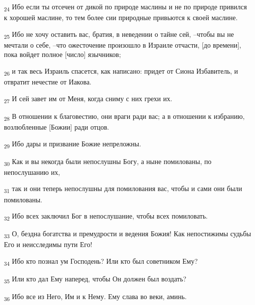 \begin{tcolorbox}
\textsubscript{24} Ибо если ты отсечен от дикой по природе маслины и не по природе привился к хорошей маслине, то тем более сии природные привьются к своей маслине.
\end{tcolorbox}
\begin{tcolorbox}
\textsubscript{25} Ибо не хочу оставить вас, братия, в неведении о тайне сей, --чтобы вы не мечтали о себе, --что ожесточение произошло в Израиле отчасти, [до времени], пока войдет полное [число] язычников;
\end{tcolorbox}
\begin{tcolorbox}
\textsubscript{26} и так весь Израиль спасется, как написано: придет от Сиона Избавитель, и отвратит нечестие от Иакова.
\end{tcolorbox}
\begin{tcolorbox}
\textsubscript{27} И сей завет им от Меня, когда сниму с них грехи их.
\end{tcolorbox}
\begin{tcolorbox}
\textsubscript{28} В отношении к благовестию, они враги ради вас; а в отношении к избранию, возлюбленные [Божии] ради отцов.
\end{tcolorbox}
\begin{tcolorbox}
\textsubscript{29} Ибо дары и призвание Божие непреложны.
\end{tcolorbox}
\begin{tcolorbox}
\textsubscript{30} Как и вы некогда были непослушны Богу, а ныне помилованы, по непослушанию их,
\end{tcolorbox}
\begin{tcolorbox}
\textsubscript{31} так и они теперь непослушны для помилования вас, чтобы и сами они были помилованы.
\end{tcolorbox}
\begin{tcolorbox}
\textsubscript{32} Ибо всех заключил Бог в непослушание, чтобы всех помиловать.
\end{tcolorbox}
\begin{tcolorbox}
\textsubscript{33} О, бездна богатства и премудрости и ведения Божия! Как непостижимы судьбы Его и неисследимы пути Его!
\end{tcolorbox}
\begin{tcolorbox}
\textsubscript{34} Ибо кто познал ум Господень? Или кто был советником Ему?
\end{tcolorbox}
\begin{tcolorbox}
\textsubscript{35} Или кто дал Ему наперед, чтобы Он должен был воздать?
\end{tcolorbox}
\begin{tcolorbox}
\textsubscript{36} Ибо все из Него, Им и к Нему. Ему слава во веки, аминь.
\end{tcolorbox}
